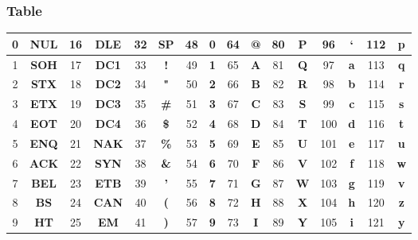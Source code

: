 \subsubsection{Table}
\begin{table}[hbt!]
\begin{tabular}{|c|c|c|c|c|c|c|c|c|c|c|c|c|c|c|c|}
\hline
0  & \textbf{NUL} & 16 & \textbf{DLE} & 32 & \textbf{SP} & 48 & \textbf{0}              & 64 & \textbf{@} & 80 & \textbf{P}                  & 96  & \textbf{`} & 112 & \textbf{p}      \\ \hline
1  & \textbf{SOH} & 17 & \textbf{DC1} & 33 & \textbf{!}  & 49 & \textbf{1}              & 65 & \textbf{A} & 81 & \textbf{Q}                  & 97  & \textbf{a} & 113 & \textbf{q}      \\ \hline
2  & \textbf{STX} & 18 & \textbf{DC2} & 34 & \textbf{"}  & 50 & \textbf{2}              & 66 & \textbf{B} & 82 & \textbf{R}                  & 98  & \textbf{b} & 114 & \textbf{r}      \\ \hline
3  & \textbf{ETX} & 19 & \textbf{DC3} & 35 & \textbf{\#} & 51 & \textbf{3}              & 67 & \textbf{C} & 83 & \textbf{S}                  & 99  & \textbf{c} & 115 & \textbf{s}      \\ \hline
4  & \textbf{EOT} & 20 & \textbf{DC4} & 36 & \textbf{\$} & 52 & \textbf{4}              & 68 & \textbf{D} & 84 & \textbf{T}                  & 100 & \textbf{d} & 116 & \textbf{t}      \\ \hline
5  & \textbf{ENQ} & 21 & \textbf{NAK} & 37 & \textbf{\%} & 53 & \textbf{5}              & 69 & \textbf{E} & 85 & \textbf{U}                  & 101 & \textbf{e} & 117 & \textbf{u}      \\ \hline
6  & \textbf{ACK} & 22 & \textbf{SYN} & 38 & \textbf{\&} & 54 & \textbf{6}              & 70 & \textbf{F} & 86 & \textbf{V}                  & 102 & \textbf{f} & 118 & \textbf{w}      \\ \hline
7  & \textbf{BEL} & 23 & \textbf{ETB} & 39 & \textbf{'}  & 55 & \textbf{7}              & 71 & \textbf{G} & 87 & \textbf{W}                  & 103 & \textbf{g} & 119 & \textbf{v}      \\ \hline
8  & \textbf{BS}  & 24 & \textbf{CAN} & 40 & \textbf{(}  & 56 & \textbf{8}              & 72 & \textbf{H} & 88 & \textbf{X}                  & 104 & \textbf{h} & 120 & \textbf{z}      \\ \hline
9  & \textbf{HT}  & 25 & \textbf{EM}  & 41 & \textbf{)}  & 57 & \textbf{9}              & 73 & \textbf{I} & 89 & \textbf{Y}                  & 105 & \textbf{i} & 121 & \textbf{y}      \\ \hline

\end{tabular}
\end{table}
